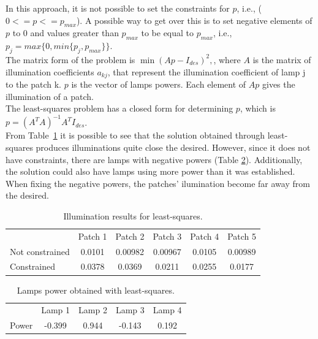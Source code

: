 \documentclass[11pt,a4paper]{article}
\begin{document}
In this approach, it is not possible to set the constraints for $p$, i.e., ($0 <= p <= p_{max}$). A possible way to get over this is to set negative elements of $p$ to 0 and values greater than $p_{max}$ to be equal to $p_{max}$, i.e., $p_j = max\{0, min\{p_j, p_{max}\}\}$.\\


The matrix form of the problem is $\min (Ap - I_{des})^2,$, where $A$ is the matrix of illumination coefficients $a_{kj}$, that represent the illumination coefficient of lamp j to the patch k. $p$ is the vector of lamps powers. Each element of $Ap$ gives the illumination of a patch.\\

The least-squares problem has a closed form for determining $p$, which is $p = (A^T A)^{-1} A^T I_{des}$.\\

From Table~\ref{tab:least-squares} it is possible to see that the solution obtained through least-squares produces illuminations quite close the desired. However, since it does not have constraints, there are lamps with negative powers (Table \ref{tab:least-squares-power}). Additionally, the solution could also have lamps using more power than it was established. 
When fixing the negative powers, the patches' ilumination become far away from the desired.

\begin{table}[!htb]
    \centering
    \caption{Illumination results for least-squares.}
    \begin{tabular}{lccccc}
        \hline
        & Patch 1 & Patch 2 & Patch 3 & Patch 4 & Patch 5\\
        Not constrained & 0.0101 & 0.00982 & 0.00967 & 0.0105 & 0.00989\\
        Constrained & 0.0378 & 0.0369 & 0.0211 & 0.0255 & 0.0177\\
        \hline
    \end{tabular}\label{tab:least-squares}
\end{table}

\begin{table}[!htb]
    \centering
    \caption{Lamps power obtained with least-squares.}
    \begin{tabular}{lcccc}
        \hline
        & Lamp 1 & Lamp 2 & Lamp 3 & Lamp 4\\
        Power & -0.399 & 0.944 & -0.143 & 0.192\\
        \hline
    \end{tabular}\label{tab:least-squares-power}
\end{table}
\end{document}
